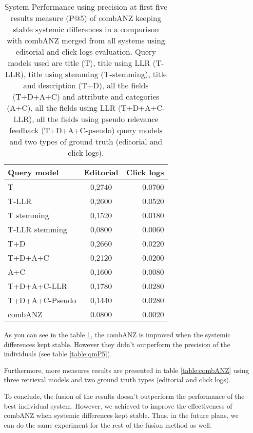 \begin{table}[H]
\begin{center}
\footnotesize
\caption{System Performance using precision at first five results measure (P@5) of combANZ keeping stable systemic differences in a comparison with combANZ merged from all systems using editorial and click logs evaluation. Query models used are title (T), title using LLR (T-LLR), title using stemming (T-stemming), title and description (T+D), all the fields (T+D+A+C) and attribute and categories (A+C), all the fields using LLR (T+D+A+C-LLR), all the fields using pseudo relevance feedback (T+D+A+C-pseudo) query models and two types of ground truth (editorial and click logs).}
\label{table:combANZP5}
\begin{tabular}{lcr}
\midrule
 Query model & Editorial & Click logs \\
 \midrule
	T & 0,2740 & 0.0700 \\
	T-LLR & 0,2600 & 0.0520 \\
	T stemming & 0,1520 & 0.0180 \\
	T-LLR stemming & 0,0800 & 0.0060 \\
	T+D & 0,2660 & 0.0220 \\
	T+D+A+C & 0,2120 & 0.0200 \\
	A+C & 0,1600 & 0.0080 \\
	T+D+A+C-LLR & 0,1780 & 0.0280 \\
	T+D+A+C-Pseudo & 0,1440 & 0.0280 \\
	\midrule
	combANZ & 0.0800 & 0.0020 \\
\bottomrule
\end{tabular}
\end{center}
\end{table}



As you can see in the table \ref{table:combANZP5}, the combANZ is improved when the systemic differences kept stable. However they didn't outperform the precision of the individuals (see table \ref{table:qmP5}).


Furthermore, more measures results are presented in table \ref{table:combANZ} using three retrieval models and two ground truth types (editorial and click logs).

To conclude, the fusion of the results doesn't outperform the performance of the best individual system. However, we achieved to improve the effectiveness of combANZ when systemic differences kept stable. Thus, in the future plans, we can do the same experiment for the rest of the fusion method as well.

